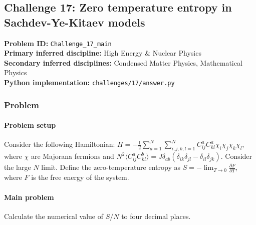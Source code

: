 \subsection[Challenge 17: Zero temperature entropy in Sachdev-Ye-Kitaev models]{Challenge 17: Zero temperature entropy in Sachdev-Ye-Kitaev models}
\textbf{Problem ID:} \texttt{Challenge\_17\_main}\\
\textbf{Primary inferred discipline:} High Energy \& Nuclear Physics\\
\textbf{Secondary inferred disciplines:} Condensed Matter Physics, Mathematical Physics\\
\textbf{Python implementation:} \texttt{challenges/17/answer.py}

\subsubsection*{Problem}
\paragraph*{Problem setup}
Consider the following Hamiltonian: $H=-\frac{1}{2}\sum_{a=1}^N\sum_{i,j,k,l=1}^N C_{ij}^a C_{kl}^a\chi_i\chi_j\chi_k\chi_l$, where $\chi$ are Majorana fermions and $N^2\langle C_{ij}^a C_{kl}^b\rangle=J\delta_{ab}(\delta_{ik}\delta_{jl}-\delta_{il}\delta_{jk})$. Consider the large $N$ limit. Define the zero-temperature entropy as $S= - \lim_{T\to 0}\frac{\partial F}{\partial T}$, where $F$ is the free energy of the system.

\paragraph*{Main problem}

Calculate the numerical value of $S/N$ to four decimal places.
